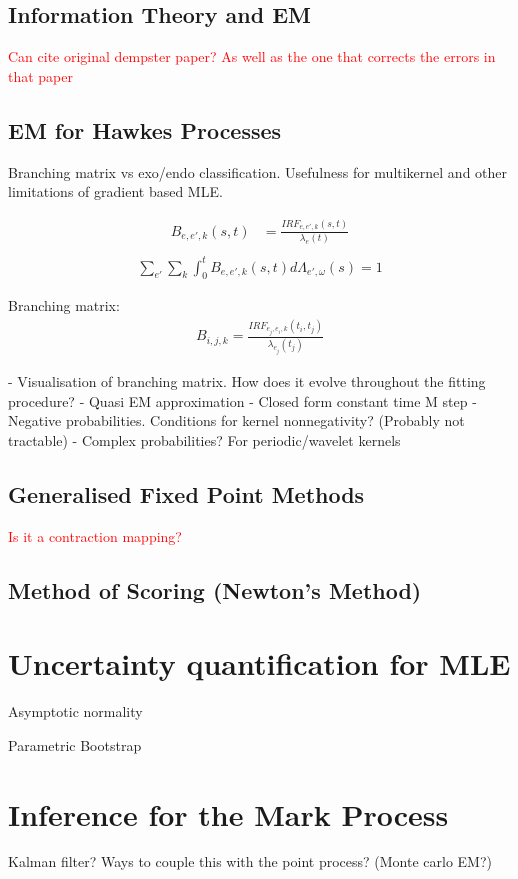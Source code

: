 \documentclass[honours,12pt]{unswthesis}
\numberwithin{equation}{section}
\begin{document}
\subsection{Information Theory and EM}
\textcolor{red}{Can cite original dempster paper? As well as the one that corrects the errors in that paper}

\subsection{EM for Hawkes Processes}
Branching matrix vs exo/endo classification. Usefulness for multikernel and other limitations of gradient based MLE.

\begin{align*}
	B_{e,e',k}(s,t)
	&= \frac{IRF_{e,e',k}(s,t)}{\lambda_{e}(t)} \\
\end{align*}
\begin{align*}
	\sum_{e'} \sum_{k} \int_0^t B_{e,e',k}(s,t)d\Lambda_{e',\omega}(s) = 1
\end{align*}

Branching matrix:
\begin{align*}
	B_{i,j,k} = \frac{IRF_{e_j,e_i,k}(t_i,t_j)}{\lambda_{e_j}(t_j)}
\end{align*}

- Visualisation of branching matrix. How does it evolve throughout the fitting procedure?
- Quasi EM approximation
- Closed form constant time M step
- Negative probabilities. Conditions for kernel nonnegativity? (Probably not tractable)
- Complex probabilities? For periodic/wavelet kernels

\subsection{Generalised Fixed Point Methods}
\textcolor{red}{Is it a contraction mapping?}

\subsection{Method of Scoring (Newton's Method)}

\section{Uncertainty quantification for MLE}
Asymptotic normality

Parametric Bootstrap

\section{Inference for the Mark Process}
Kalman filter? Ways to couple this with the point process? (Monte carlo EM?)
\end{document}
